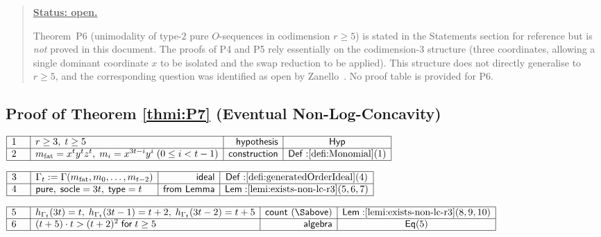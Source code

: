 \documentclass[11pt,reqno]{amsart}
\begin{document}
\begin{quotation}
\noindent \underline{\textbf{Status: open.} }

\bigskip 
\medskip%

\noindent%
Theorem~P6 (unimodality of type-$2$ pure $O$-sequences in codimension $r\geq
5$) is stated in the Statements section for reference but is \emph{not}
proved in this document. The proofs of P4 and P5 rely essentially on the
codimension-$3$ structure (three coordinates, allowing a single dominant
coordinate $x$ to be isolated and the swap reduction to be applied). This
structure does not directly generalise to $r\geq 5$, and the corresponding
question was identified as open by Zanello~\cite{zanello2024}. No proof
table is provided for P6.
\end{quotation}

\medskip

\subsection*{Proof of Theorem \protect\ref{thmi:P7} (Eventual
Non-Log-Concavity)}

\noindent $%
\begin{array}{|m{0.5cm}|l|r|c|}
\hline
1 & r\geq 3,\;t\geq 5 & \mathsf{hypothesis} & \mathsf{Hyp} \\ \hline
2 & m_{\mathrm{fat}}=x^{t}y^{t}z^{t},\;m_{i}=x^{3t-i}y^{i}\;(0\leq i<t-1) & 
\mathsf{construction} & \mathsf{Def:}\ref{defi:Monomial}(1) \\ \hline
\end{array}%
$

\nointerlineskip\noindent$%
\begin{array}{|m{0.5cm}|l|r|c|}
\hline
3 & \Gamma_{t}:=\Gamma(m_{\mathrm{fat}},m_{0},\dots,m_{t-2}) & \mathsf{ideal}
& \mathsf{Def:}\ref{defi:generatedOrderIdeal}(4) \\ \hline
4 & \mathsf{pure},\;\mathsf{socle}=3t,\;\mathsf{type}=t & \mathsf{from\ Lemma%
} & \mathsf{Lem:}\ref{lemi:exists-non-lc-r3}(5,6,7) \\ \hline
\end{array}%
$

\nointerlineskip\noindent$%
\begin{array}{|m{0.5cm}|l|r|c|}
\hline
5 & h_{\Gamma_{t}}(3t)=t,\;h_{\Gamma_{t}}(3t-1)=t+2,\;h_{%
\Gamma_{t}}(3t-2)=t+5 & \mathsf{count\ (\S above)} & \mathsf{Lem:}\ref%
{lemi:exists-non-lc-r3}(8,9,10) \\ \hline
6 & (t+5)\cdot t>(t+2)^{2}\;\mathsf{for}\;t\ge5 & \mathsf{algebra} & \mathsf{%
Eq}(5) \\ \hline
\end{array}%
$
\end{document}

